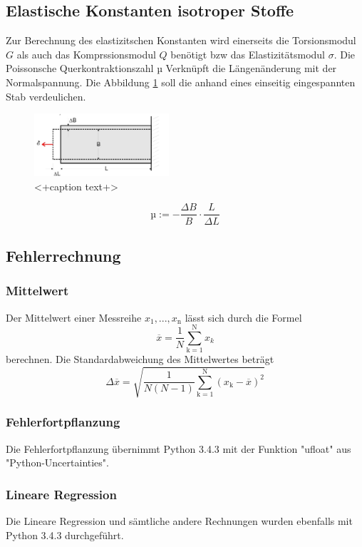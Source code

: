 \subsection{Elastische Konstanten isotroper Stoffe}
Zur Berechnung des elastizitschen Konstanten wird einerseits die Torsionsmodul $G$ als auch das Komprssionsmodul $Q$ benötigt bzw das Elastizitätsmodul $\sigma$.
Die Poissonsche Querkontraktionszahl µ Verknüpft die Längenänderung mit der Normalspannung. Die Abbildung \ref{fig:poisson} soll die anhand eines einseitig eingespannten Stab verdeulichen.
\begin{figure}
  \centering
  \includegraphics[width=5.0cm]{./picture/poisson.png}
  \caption{<+caption text+>}
  \label{fig:poisson}
\end{figure}
\begin{equation}
  µ := -\frac{\Delta B}{B} \cdot \frac{L}{\Delta L}
  \label{eqn:pois}
\end{equation}


\subsection{Fehlerrechnung}
\subsubsection{Mittelwert}
Der Mittelwert einer Messreihe $x_\text{1}, ... ,x_\text{n}$ lässt sich durch die Formel
\begin{equation}
	\overline{x} = \frac{1}{N} \sum_{\text{k}=1}^\text{N} x_k
	\label{eqn:ave}
\end{equation}
berechnen. Die Standardabweichung des Mittelwertes beträgt
\begin{equation}
	\Delta \overline{x} = \sqrt{ \frac{1}{N(N-1)} \sum_{\text{k}=1}^\text{N} (x_\text{k} - \overline{x})^2}
	\label{eqn:std}
\end{equation}

\subsubsection{Fehlerfortpflanzung}
Die Fehlerfortpflanzung übernimmt Python 3.4.3 mit der Funktion "ufloat" aus "Python-Uncertainties".

\subsubsection{Lineare Regression}
Die Lineare Regression und sämtliche andere Rechnungen wurden ebenfalls mit Python 3.4.3 durchgeführt.
